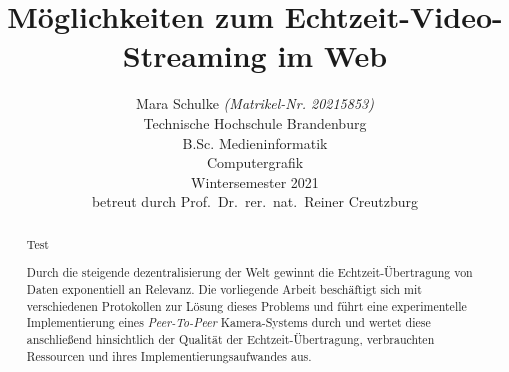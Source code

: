 \documentclass{article}
\title{Möglichkeiten zum Echtzeit-Video-Streaming im Web}
\author{
	\vspace{0.5em}
	Mara Schulke \textit{(Matrikel-Nr. 20215853)}\\
	\small{Technische Hochschule Brandenburg}\\
	\small{B.Sc. Medieninformatik}\\
	\small{Computergrafik}\\
	\small{Wintersemester 2021}\\
	\small{betreut durch Prof.\ Dr.\ rer.\ nat.\ Reiner Creutzburg}\\
}
\begin{document}
\begin{onecolumn}
	\begin{titlepage}


		\maketitle

		\begin{abstract}
		   Test
		   
			Durch die steigende dezentralisierung der Welt gewinnt die
			Echtzeit-Übertragung von Daten exponentiell an Relevanz. Die
			vorliegende Arbeit beschäftigt sich mit verschiedenen Protokollen
			zur Lösung dieses Problems und führt eine experimentelle
			Implementierung eines \textit{Peer-To-Peer} Kamera-Systems durch
			und wertet diese anschließend hinsichtlich der Qualität der
			Echtzeit-Übertragung, verbrauchten Ressourcen und ihres
			Implementierungsaufwandes aus.
		\end{abstract}

		\tableofcontents

		\listoffigures
	\end{titlepage}
\end{onecolumn}

\end{document}
